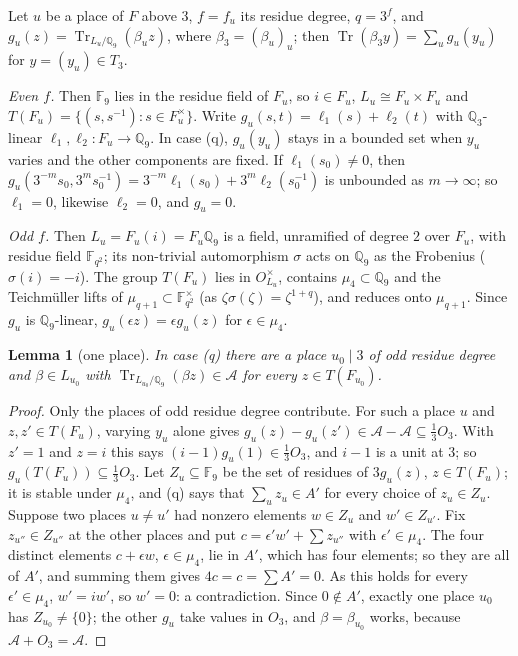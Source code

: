 \documentclass[11pt,a4paper]{amsart}
\newtheorem{lemma}{Lemma}
\theoremstyle{remark}
\newcommand{\Q}{\mathbb{Q}}
\newcommand{\F}{\mathbb{F}}
\newcommand{\Tr}{\operatorname{Tr}}
\newcommand{\cA}{\mathcal{A}}
\begin{document}
Let $u$ be a place of $F$ above $3$, $f=f_u$ its residue degree, $q=3^f$, and $g_u(z)=\Tr_{L_u/\Q_9}(\beta_uz)$,
where $\beta_3=(\beta_u)_u$; then $\Tr(\beta_3y)=\sum_ug_u(y_u)$ for $y=(y_u)\in T_3$.

\emph{Even $f$.} Then $\F_9$ lies in the residue field of $F_u$, so $i\in F_u$, $L_u\cong F_u\times F_u$ and
$T(F_u)=\{(s,s^{-1}):s\in F_u^\times\}$. Write $g_u(s,t)=\ell_1(s)+\ell_2(t)$ with $\Q_3$-linear
$\ell_1,\ell_2:F_u\to\Q_9$. In case (q), $g_u(y_u)$ stays in a bounded set when $y_u$ varies and the other
components are fixed. If $\ell_1(s_0)\ne0$, then $g_u(3^{-m}s_0,3^ms_0^{-1})=3^{-m}\ell_1(s_0)+3^m\ell_2(s_0^{-1})$
is unbounded as $m\to\infty$; so $\ell_1=0$, likewise $\ell_2=0$, and $g_u=0$.

\emph{Odd $f$.} Then $L_u=F_u(i)=F_u\Q_9$ is a field, unramified of degree $2$ over $F_u$, with residue field
$\F_{q^2}$; its non-trivial automorphism $\sigma$ acts on $\Q_9$ as the Frobenius ($\sigma(i)=-i$). The group
$T(F_u)$ lies in $O_{L_u}^\times$, contains $\mu_4\subset\Q_9$ and the Teichm\"uller lifts of
$\mu_{q+1}\subset\F_{q^2}^\times$ (as $\zeta\sigma(\zeta)=\zeta^{1+q}$), and reduces onto $\mu_{q+1}$. Since $g_u$
is $\Q_9$-linear, $g_u(\epsilon z)=\epsilon g_u(z)$ for $\epsilon\in\mu_4$.

\begin{lemma}[one place]\label{lem:B3}
In case \textup{(q)} there are a place $u_0\mid3$ of odd residue degree and $\beta\in L_{u_0}$ with
$\Tr_{L_{u_0}/\Q_9}(\beta z)\in\cA$ for every $z\in T(F_{u_0})$.
\end{lemma}

\begin{proof}
Only the places of odd residue degree contribute. For such a place $u$ and $z,z'\in T(F_u)$, varying $y_u$ alone
gives $g_u(z)-g_u(z')\in\cA-\cA\subseteq\frac13O_3$. With $z'=1$ and $z=i$ this says
$(i-1)g_u(1)\in\frac13O_3$, and $i-1$ is a unit at $3$; so $g_u(T(F_u))\subseteq\frac13O_3$. Let $Z_u\subseteq\F_9$
be the set of residues of $3g_u(z)$, $z\in T(F_u)$; it is stable under $\mu_4$, and (q) says that $\sum_uz_u\in A'$
for every choice of $z_u\in Z_u$. Suppose two places $u\ne u'$ had nonzero elements $w\in Z_u$ and $w'\in Z_{u'}$.
Fix $z_{u''}\in Z_{u''}$ at the other places and put $c=\epsilon'w'+\sum z_{u''}$ with $\epsilon'\in\mu_4$. The four
distinct elements $c+\epsilon w$, $\epsilon\in\mu_4$, lie in $A'$, which has four elements; so they are all of $A'$,
and summing them gives $4c=c=\sum A'=0$. As this holds for every $\epsilon'\in\mu_4$, $w'=iw'$, so $w'=0$: a
contradiction. Since $0\notin A'$, exactly one place $u_0$ has $Z_{u_0}\ne\{0\}$; the other $g_u$ take values in
$O_3$, and $\beta=\beta_{u_0}$ works, because $\cA+O_3=\cA$.
\end{proof}
\end{document}
